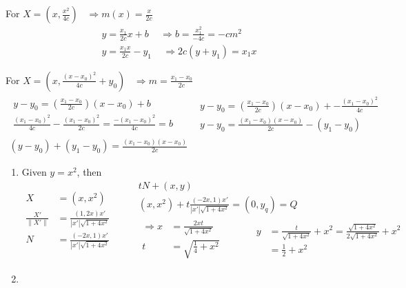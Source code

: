 \documentclass[twoside]{amsart}
\theoremstyle{plain}
\theoremstyle{definition}
\newcommand{\exercisehead}[1]
  {\smallskip
   \noindent{\small\bf Exercise #1.}}
\begin{document}
For $X = (x, \frac{x^2}{4c} )$ \quad \, $\Longrightarrow m(x) = \frac{x}{2c}$
\[
\begin{gathered}
  y = \frac{x_1}{2c} x + b \quad \, \Longrightarrow b = \frac{x_1^2}{-4c} = -cm^2 \\
  y = \frac{x_1 x}{2c} - y_1 \quad \, \Longrightarrow \boxed{ 2c (y+y_1) = x_1 x }
\end{gathered}
\]

For $X = \left( x, \frac{ (x-x_0)^2}{4c} + y_0 \right)$ \quad \, $\Longrightarrow m = \frac{x_1 - x_0}{2c}$ \\
\[
\begin{gathered}
  \begin{gathered}
    y- y_0 = \left( \frac{x_1 - x_0}{2c} \right)(x-x_0) + b \\
    \frac{ (x_1 - x_0)^2 }{4c} - \frac{ (x_1 - x_0)^2}{2c} = \frac{ - (x_1-x_0)^2}{4c} = b 
  \end{gathered} \quad \quad \begin{gathered}
    y-y_0 = \left( \frac{x_1 - x_0 }{2c} \right)(x-x_0) + - \frac{(x_1 -x_0)^2}{4c} \\
    y - y_0 = \frac{ (x_1 - x_0)(x-x_0)}{2c} -(y_1 - y_0) 
\end{gathered} \\
  \boxed{ (y-y_0) + (y_1 -y_0) = \frac{ (x_1 - x_0)(x-x_0)}{2c} }
\end{gathered}
\]

\exercisehead{7}
\begin{enumerate}
\item Given $y=x^2$, then 
\[
  \begin{aligned}
  X & = (x,x^2) \\
  \frac{X'}{\|X' \| } & = \frac{ (1,2x) x' }{ |x'| \sqrt{ 1 + 4x^2 } } \\
  N & = \frac{ (-2x,1)x' }{ |x'| \sqrt{ 1 + 4x^2 } }
\end{aligned} \quad \quad \, 
  \begin{gathered}
    tN + (x,y) \\
    (x,x^2) + t \frac{ (-2x,1)x' }{ |x'| \sqrt{ 1 + 4x^2 } } = (0,y_q) = Q \\
    \begin{aligned}
    \Longrightarrow x &= \frac{ 2xt}{\sqrt{ 1 + 4x^2 } } \\
    t &= \sqrt{ \frac{1}{4} + x^2 } 
\end{aligned} \quad \quad \quad \begin{aligned}
      y & = \frac{t}{\sqrt{ 1 + 4x^2} } + x^2 = \frac{\sqrt{ 1 + 4x^2}}{2 \sqrt{ 1 + 4x^2 }} +x^2 \\
      & = \frac{1}{2} + x^2 
\end{aligned}
\end{gathered}
\]
\item
\end{enumerate}
\end{document}
